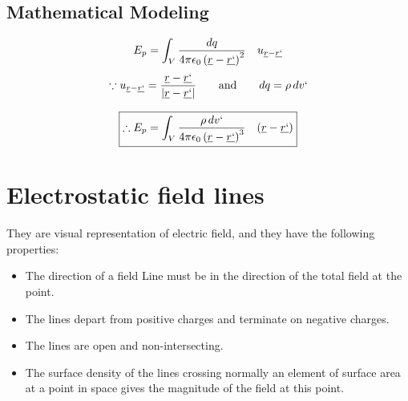 \documentclass[12 pt]{article}
\begin{document}
\subsection{Mathematical Modeling}
$$
E_p=\int_V \frac{dq}{4\pi\epsilon_0\left(\underline{r}-\underline{r`}\right)^2}\quad {u_{\underline{r}-\underline{r`}}} 
$$
$$\because u_{\underline{r}-\underline{r`}}=\frac{\underline{r}-\underline{r`}}{|\underline{r}-\underline{r`}|} \quad\quad \text{and}\quad\quad dq=\rho\, dv`$$

$$\boxed{\therefore E_p=\int_V \frac{\rho \, dv`}{4\pi\epsilon_0\left(\underline{r}-\underline{r`}\right)^3}\quad {\left(\underline{r}-\underline{r`}\right)}}$$
\newpage
\section{Electrostatic field lines}
They are visual representation of electric field, and they have the following properties: \begin{itemize}
    \item The direction of a field Line must be in the direction of the total field at the point.
    \item The lines depart from positive charges and terminate on negative charges.
    \item The lines are open and non-intersecting.
    \item The surface density of the lines crossing normally an element of surface area at a point in space gives the magnitude of the field at this point.
\end{itemize}
\end{document}

